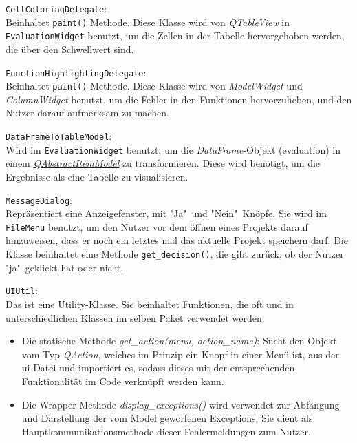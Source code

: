 \documentclass{article}
\newcommand{\classref}[1]{\texttt{#1}}
\begin{document}
\classref{CellColoringDelegate}:\\ Beinhaltet \texttt{paint()} Methode. Diese Klasse wird von \textit{QTableView} in \classref{EvaluationWidget} benutzt, um die Zellen in der Tabelle hervorgehoben werden, die über den Schwellwert sind. \newline

\classref{FunctionHighlightingDelegate}:\\ Beinhaltet \texttt{paint()} Methode. Diese Klasse wird von \textit{ModelWidget} und \textit{ColumnWidget} benutzt, um die Fehler in den Funktionen hervorzuheben, und den Nutzer darauf aufmerksam zu machen. \newline

\classref{DataFrameToTableModel}:\\ Wird im \classref{EvaluationWidget} benutzt, um die  \textit{DataFrame}-Objekt (evaluation) in einem \href{https://doc.qt.io/qt-6/qtableview.html#setModel}{\textit{QAbstractItemModel}} zu transformieren. Diese wird benötigt, um die Ergebnisse als eine Tabelle zu visualisieren. \newline

\classref{MessageDialog}:\\ Repräsentiert eine Anzeigefenster, mit "Ja"\ und "Nein"\ Knöpfe. Sie wird im \classref{FileMenu} benutzt, um den Nutzer vor dem öffnen eines Projekts darauf hinzuweisen, dass er noch ein letztes mal das aktuelle Projekt speichern darf. Die Klasse beinhaltet eine Methode \texttt{get\_decision()}, die gibt zurück, ob der Nutzer "ja"\ geklickt hat oder nicht. \newline

\classref{UIUtil}:\\ Das ist eine Utility-Klasse. Sie beinhaltet Funktionen, die oft und in unterschiedlichen Klassen im selben Paket verwendet werden.
\begin{itemize}
    \item Die statische Methode \textit{get\_action(menu, action\_name)}: Sucht den Objekt vom Typ \textit{QAction}, welches im Prinzip ein Knopf in einer Menü ist, aus der ui-Datei und importiert es, 
    sodass dieses mit der entsprechenden Funktionalität im Code verknüpft werden kann.
    \item Die Wrapper Methode \textit{display\_exceptions()} wird verwendet zur Abfangung und Darstellung der vom Model geworfenen Exceptions. Sie dient als Hauptkommunikationsmethode dieser Fehlermeldungen zum Nutzer.
\end{itemize}
\end{document}
